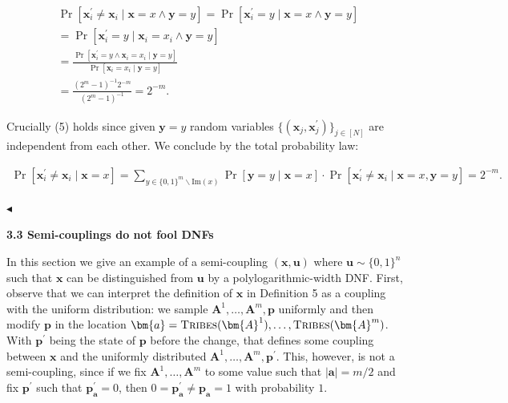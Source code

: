 \[\begin{gathered}
\displaystyle\Pr[\bm{x}^{\prime}_{i}\neq\bm{x}_{i}\mid\bm{x}=x\land\bm{y}=y] \displaystyle=\Pr[\bm{x}^{\prime}_{i}=y\mid\bm{x}=x\land\bm{y}=y] \\
\displaystyle=\Pr[\bm{x}^{\prime}_{i}=y\mid\bm{x}_{i}=x_{i}\land\bm{y}=y] \\
\displaystyle=\frac{\Pr[\bm{x}^{\prime}_{i}=y\land\bm{x}_{i}=x_{i}\mid\bm{y}=y]}{\Pr[\bm{x}_{i}=x_{i}\mid\bm{y}=y]} \\
\displaystyle=\frac{(2^{m}-1)^{-1}2^{-m}}{(2^{m}-1)^{-1}}=2^{-m}.
\end{gathered}\]


Crucially (5) holds since given $\bm{y}=y$ random variables $\{(\bm{x}_{j},\bm{x}^{\prime}_{j})\}_{j\in[N]}$ are independent from each other. We conclude by the total probability law:\par


\[\begin{gathered}
\Pr[\bm{x}^{\prime}_{i}\neq\bm{x}_{i}\mid\bm{x}=x]=\sum_{y\in\{0,1\}^{m}\smallsetminus\mathrm{Im}(x)}\Pr[\bm{y}=y\mid\bm{x}=x]\cdot\Pr[\bm{x}^{\prime}_{i}\neq\bm{x}_{i}\mid\bm{x}=x,\bm{y}=y]=2^{-m}.\
\end{gathered}\]


$\blacktriangleleft$\par






\par\medskip\noindent\textbf{
3.3 Semi-couplings do not fool DNFs}\par




In this section we give an example of a semi-coupling $(\bm{x},\bm{u})$ where $\bm{u}\sim\{0,1\}^{n}$ such that $\bm{x}$ can be distinguished from $\bm{u}$ by a polylogarithmic-width DNF. First, observe that we can interpret the definition of $\bm{x}$ in Definition 5 as a coupling with the uniform distribution: we sample $\bm{A}^{1},\dots,\bm{A}^{m},\bm{p}$ uniformly and then modify $\bm{p}$ in the location $\bm{a}=\textsc{Tribes}(\bm{A}^{1}),\dots,\textsc{Tribes}(\bm{A}^{m})$. With $\bm{p}^{\prime}$ being the state of $\bm{p}$ before the change, that defines some coupling between $\bm{x}$ and the uniformly distributed $\bm{A}^{1},\dots,\bm{A}^{m},\bm{p}^{\prime}$. This, however, is not a semi-coupling, since if we fix $\bm{A}^{1},\dots,\bm{A}^{m}$ to some value such that $|\bm{a}|=m/2$ and fix $\bm{p}^{\prime}$ such that $\bm{p}^{\prime}_{\bm{a}}=0$, then $0=\bm{p}^{\prime}_{\bm{a}}\neq\bm{p}_{\bm{a}}=1$ with probability $1$.\par




